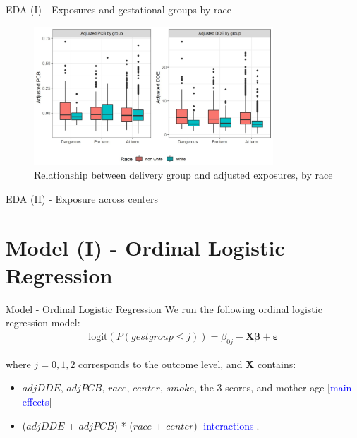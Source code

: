 \documentclass{beamer}
\begin{document}
	\begin{frame}{EDA (I) - Exposures and gestational groups by race}
	
	\begin{figure}
		\centering
		\includegraphics[width=0.8\textwidth]{pcb_dde_per_gest.jpeg}
		\caption{Relationship between delivery group and adjusted exposures, by race}
		\label{fig:p1}
	\end{figure}
\end{frame}

\begin{frame}{EDA (II) - Exposure across centers}
\end{frame}



\section{Model (I) - Ordinal Logistic Regression}

\begin{frame}{Model - Ordinal Logistic Regression}
We run the following ordinal logistic regression model:
\begin{align*}
\textrm{logit}(P(gestgroup \leq j)) = \beta_{0j} - \mathbf{X} \boldsymbol{\beta} + \boldsymbol{\varepsilon}
\end{align*}

where $j = 0,1,2$ corresponds to the outcome level, and \textbf{X} contains:
\begin{itemize}
	\item $adjDDE$, $adjPCB$, $race$, $center$, $smoke$, the 3 scores, and mother age [\textcolor{blue}{main effects}]
	\item ($adjDDE$ + $adjPCB$) * ($race$ + $center$) [\textcolor{blue}{interactions}].
\end{itemize}

\end{frame}
\end{document}
